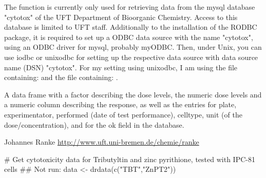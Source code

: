 \begin{Details}\relax
The function is currently only used for retrieving data from the
mysql database "cytotox" of the UFT Department of Bioorganic Chemistry.
Access to this database is limited to UFT staff.  Additionally to the
installation of the RODBC package, it is required to set up a ODBC data
source with the name "cytotox", using an ODBC driver for mysql, probably
myODBC. Then, under Unix, you can use iodbc or unixodbc for setting up the
respective data source with data source name (DSN) "cytotox". For my
setting using unixodbc, I am using the file 
containing: 
and the file  containing:
.
\end{Details}
\begin{Value}
\begin{ldescription}
\item[\code{data}] A data frame with a factor describing the dose levels, the numeric dose levels
and a numeric column describing the response, as well as the entries for
plate, experimentator, performed (date of test performance), celltype, unit
(of the dose/concentration), and for the ok field in the database.
\end{ldescription}
\end{Value}
\begin{Author}\relax
Johannes Ranke 
\url{http://www.uft.uni-bremen.de/chemie/ranke}
\end{Author}
\begin{Examples}
\begin{ExampleCode}
# Get cytotoxicity data for Tributyltin and zinc pyrithione, tested with IPC-81 cells
## Not run: data <- drdata(c("TBT","ZnPT2"))
\end{ExampleCode}
\end{Examples}


